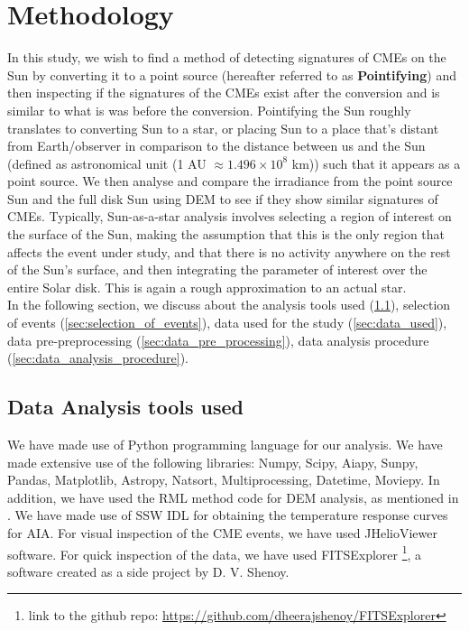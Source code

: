 \message{ !name(main.tex)}\documentclass[12pt]{article}
\begin{document}
\section{Methodology}

In this study, we wish to find a method of detecting signatures of CMEs on the Sun by converting it to a point source (hereafter referred to as \textbf{Pointifying}) and then inspecting if the signatures of the CMEs exist after the conversion and is similar to what is was before the conversion. Pointifying the Sun roughly translates to converting Sun to a star, or placing Sun to a place that's distant from Earth/observer in comparison to the distance between us and the Sun (defined as astronomical unit (1 AU $\approx 1.496\times10^{8}$ km)) such that it appears as a point source. We then analyse and compare the irradiance from the point source Sun and the full disk Sun using DEM to see if they show similar signatures of CMEs. Typically, Sun-as-a-star analysis involves selecting a region of interest on the surface of the Sun, making the assumption that this is the only region that affects the event under study, and that there is no activity anywhere on the rest of the Sun's surface, and then integrating the parameter of interest over the entire Solar disk. This is again a rough approximation to an actual star.\\

In the following section, we discuss about the analysis tools used (\cref{sec:data_analysis_tools_used}), selection of events (\cref{sec:selection_of_events}), data used for the study (\cref{sec:data_used}), data pre-preprocessing (\cref{sec:data_pre_processing}), data analysis procedure (\cref{sec:data_analysis_procedure}).

  \subsection{Data Analysis tools used}
  \label{sec:data_analysis_tools_used}

We have made use of Python programming language for our analysis. We have made extensive use of the following libraries: Numpy, Scipy, Aiapy, Sunpy, Pandas, Matplotlib, Astropy, Natsort, Multiprocessing, Datetime, Moviepy. In addition, we have used the RML method code for DEM analysis, as mentioned in \citep{Massa2023}. We have made use of SSW IDL for obtaining the temperature response curves for AIA. For visual inspection of the CME events, we have used JHelioViewer software. For quick inspection of the data, we have used FITSExplorer \footnote{link to the github repo: \url{https://github.com/dheerajshenoy/FITSExplorer}}, a software created as a side project by D. V. Shenoy.
\end{document}
